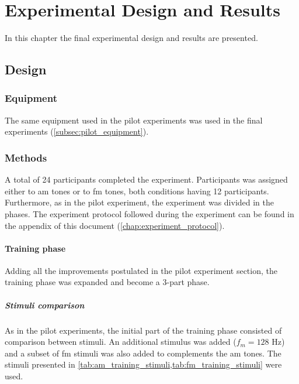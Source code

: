 \documentclass[../main.tex]{subfiles}
\begin{document}
\chapter{Experimental Design and Results}

In this chapter the final experimental design and results are presented.

\section{Design}

\subsection{Equipment}

The same equipment used in the pilot experiments was used in the final
experiments (\ref{subsec:pilot_equipment}).

\subsection{Methods}

A total of 24 participants completed the experiment. Participants was assigned
either to \gls{am} tones or to \gls{fm} tones, both conditions having 12
participants. Furthermore, as in the pilot experiment, the experiment was
divided in the phases. The experiment protocol followed during the experiment
can be found in the appendix of this document (\ref{chap:experiment_protocol}).

\subsubsection{Training phase}

Adding all the improvements postulated in the pilot experiment section, the
training phase was expanded and become a 3-part phase.

\paragraph{Stimuli comparison}

As in the pilot experiments, the initial part of the training phase consisted
of comparison between stimuli. An additional stimulus was added ($f_m = 128$ Hz)
and a subset of \gls{fm} stimuli was also added to complements the \gls{am}
tones. The stimuli presented in
\cref{tab:am_training_stimuli,tab:fm_training_stimuli} were used.
\end{document}
